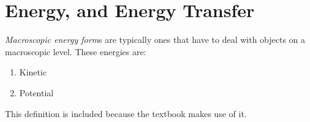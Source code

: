 \section{Energy, and Energy Transfer}\label{sec:Energy_Energy_Transfer}
\begin{definition}\label{def:Macroscopic_Energy_Form}
  \emph{Macroscopic energy form}s are typically ones that have to deal with objects on a macroscopic level.
  These energies are:
  \begin{enumerate}[noitemsep]
  \item Kinetic
  \item Potential
  \end{enumerate}

  \begin{remark}
    This definition is included because the textbook makes use of it.
  \end{remark}
\end{definition}


